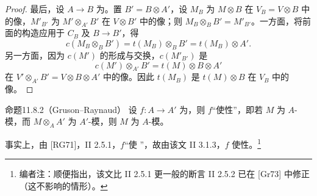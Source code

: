 \begin{proof}
最后，设 $A\to B$ 为。置 $B'=B\otimes A'$，设 $M_B$ 为 $M\otimes B$ 在 $V_B=V\otimes B$ 中的像，$M'_{B'}$ 为 $M'\otimes_{A'}B'$ 在 $V\otimes B'$ 中的像；则 $M_B\otimes_B B'=M'_{B'}$。一方面，将前面的构造应用于 $C_B$ 及 $B\to B'$，得
\[
c(M_B\otimes_B B')=t(M_B)\otimes_B B'=t(M_B)\otimes A'.
\]
另一方面，因为 $c(M')$ 的形成与交换，$c(M'_{B'})$ 是
\[
c(M')\otimes_{A'}B'=t(M)\otimes B\otimes A'
\]
在 $V'\otimes_{A'}B'=V\otimes B\otimes A'$ 中的像。因此 $t(M_B)$ 是 $t(M)\otimes B$ 在 $V_B$ 中的像。
\end{proof}

\begin{SGAresult}{命题}{11.8.2（Gruson--Raynaud）}
设 $f:A\to A'$ 为，则 $f$“使性”，即若 $M$ 为 $A$-模，而 $M\otimes_A A'$ 为 $A'$-模，则 $M$ 为 $A$-模。
\end{SGAresult}
事实上，由 [RG71]，II 2.5.1，$f$“使 ”，故由该文 II 3.1.3，$f$ 使性。\footnote{编者注：顺便指出，该文比 II 2.5.1 更一般的断言 II 2.5.2 已在 [Gr73] 中修正（这不影响的情形）。}

